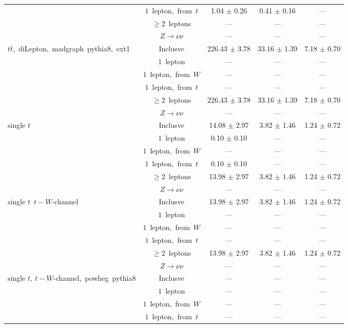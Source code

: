 \documentclass{article}
\begin{document}
\begin{longtable}{|l|c|c|c|c|}
 & $1$~lepton,~from~$t$  & 1.04 $\pm$ 0.26  & 0.41 $\pm$ 0.16  & --- \\* 
 & $\ge2$~leptons  & ---  & ---  & --- \\* 
 & $Z\rightarrow\nu\nu$  & ---  & ---  & --- \\* 
\hline 
\multirow{6}{*}{$t\bar{t}$,~diLepton,~madgraph~pythia8,~ext1} & Inclusve  & 226.43 $\pm$ 3.78  & 33.16 $\pm$ 1.39  & 7.18 $\pm$ 0.70 \\* 
 & $1$~lepton  & ---  & ---  & --- \\* 
 & $1$~lepton,~from~$W$  & ---  & ---  & --- \\* 
 & $1$~lepton,~from~$t$  & ---  & ---  & --- \\* 
 & $\ge2$~leptons  & 226.43 $\pm$ 3.78  & 33.16 $\pm$ 1.39  & 7.18 $\pm$ 0.70 \\* 
 & $Z\rightarrow\nu\nu$  & ---  & ---  & --- \\* 
\hline 
\multirow{6}{*}{single $t$} & Inclusve  & 14.08 $\pm$ 2.97  & 3.82 $\pm$ 1.46  & 1.24 $\pm$ 0.72 \\* 
 & $1$~lepton  & 0.10 $\pm$ 0.10  & ---  & --- \\* 
 & $1$~lepton,~from~$W$  & ---  & ---  & --- \\* 
 & $1$~lepton,~from~$t$  & 0.10 $\pm$ 0.10  & ---  & --- \\* 
 & $\ge2$~leptons  & 13.98 $\pm$ 2.97  & 3.82 $\pm$ 1.46  & 1.24 $\pm$ 0.72 \\* 
 & $Z\rightarrow\nu\nu$  & ---  & ---  & --- \\* 
\hline 
\multirow{6}{*}{single $t$~$t-W$-channel} & Inclusve  & 13.98 $\pm$ 2.97  & 3.82 $\pm$ 1.46  & 1.24 $\pm$ 0.72 \\* 
 & $1$~lepton  & ---  & ---  & --- \\* 
 & $1$~lepton,~from~$W$  & ---  & ---  & --- \\* 
 & $1$~lepton,~from~$t$  & ---  & ---  & --- \\* 
 & $\ge2$~leptons  & 13.98 $\pm$ 2.97  & 3.82 $\pm$ 1.46  & 1.24 $\pm$ 0.72 \\* 
 & $Z\rightarrow\nu\nu$  & ---  & ---  & --- \\* 
\hline 
\multirow{6}{*}{single $t,~t-W$-channel,~powheg~pythia8} & Inclusve  & ---  & ---  & --- \\* 
 & $1$~lepton  & ---  & ---  & --- \\* 
 & $1$~lepton,~from~$W$  & ---  & ---  & --- \\* 
 & $1$~lepton,~from~$t$  & ---  & ---  & --- \\* 

\end{longtable}
\end{document}
